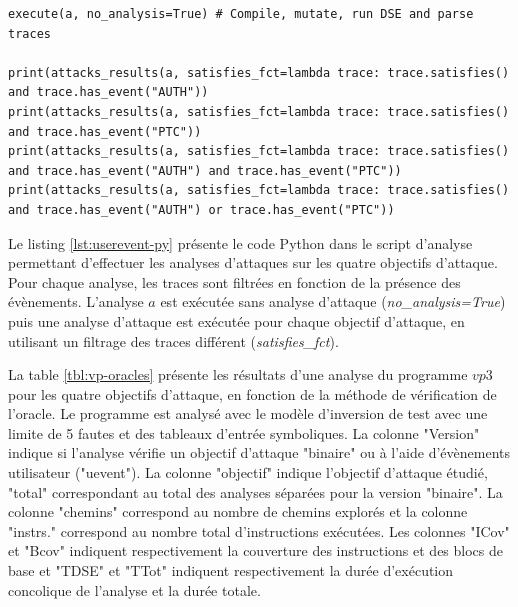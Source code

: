 \begin{lstlisting}    
execute(a, no_analysis=True) # Compile, mutate, run DSE and parse traces

print(attacks_results(a, satisfies_fct=lambda trace: trace.satisfies() and trace.has_event("AUTH"))
print(attacks_results(a, satisfies_fct=lambda trace: trace.satisfies() and trace.has_event("PTC"))
print(attacks_results(a, satisfies_fct=lambda trace: trace.satisfies() and trace.has_event("AUTH") and trace.has_event("PTC"))
print(attacks_results(a, satisfies_fct=lambda trace: trace.satisfies() and trace.has_event("AUTH") or trace.has_event("PTC"))
\end{lstlisting}

            Le listing \ref{lst:userevent-py} présente le code Python dans le script d'analyse permettant d'effectuer les analyses d'attaques sur les quatre objectifs d'attaque. Pour chaque analyse, les traces sont filtrées en fonction de la présence des évènements.
            L'analyse $a$ est exécutée sans analyse d'attaque (\textit{no\_analysis=True}) puis une analyse d'attaque est exécutée pour chaque objectif d'attaque, en utilisant un filtrage des traces différent (\textit{satisfies\_fct}).
            
            La table \ref{tbl:vp-oracles} présente les résultats d'une analyse du programme $vp3$ pour les quatre objectifs d'attaque, en fonction de la méthode de vérification de l'oracle. Le programme est analysé avec le modèle d'inversion de test avec une limite de 5 fautes et des tableaux d'entrée symboliques.
            La colonne "Version" indique si l'analyse vérifie un objectif d'attaque "binaire" ou à l'aide d'évènements utilisateur ("uevent"). La colonne "objectif" indique l'objectif d'attaque étudié, "total" correspondant au total des analyses séparées pour la version "binaire".
            La colonne "chemins" correspond au nombre de chemins explorés et la colonne "instrs." correspond au nombre total d'instructions exécutées. 
            Les colonnes "ICov" et "Bcov" indiquent respectivement la couverture des instructions et des blocs de base et "TDSE" et "TTot" indiquent respectivement la durée d'exécution concolique de l'analyse et la durée totale.
            

